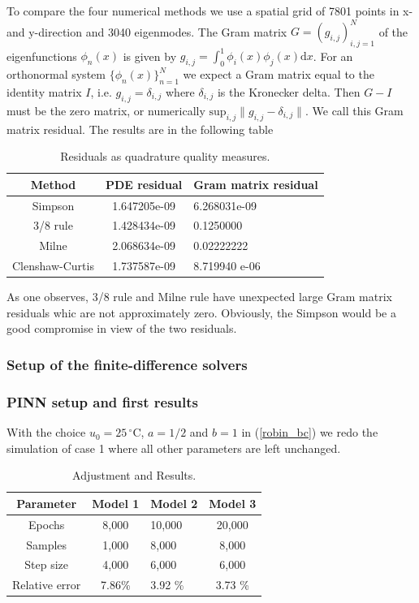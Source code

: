 \documentclass[a4paper,11pt]{article}
\theoremstyle{plain} %
\theoremstyle{definition} %
\theoremstyle{remark} %
\theoremstyle{remark}
\begin{document}
To compare the four numerical methods we use a spatial grid of 7801 points in x- and y-direction and 3040 eigenmodes. The Gram matrix $G = (g_{i,j})_{i,j=1}^N $ of the eigenfunctions $\phi_n (x) $ is given by $g_{i,j} = \int_0^1 \phi_i (x)\phi_j (x) \mathrm{d}x $. For an orthonormal system $\{ \phi_n (x) \}_{n=1}^N $ we expect a Gram matrix equal to the identity matrix $I$, i.e. $g_{i,j} = \delta_{i,j} $ where $ \delta_{i,j} $ is the Kronecker delta. Then $ G - I $ must be the zero matrix, or numerically $ \mathrm{sup}_{i,j} \| g_{i,j} - \delta_{i,j} \| $. We call this Gram matrix residual. The results are in the following table
\begin{table}[h!] 
\centering
{ \renewcommand{\arraystretch}{1.4}
\begin{tabular}{ccl}
\toprule
\textbf{Method} & \textbf{PDE residual} & \textbf{Gram matrix residual}\\
\midrule
Simpson & 1.647205e-09 & 6.268031e-09 \\
3/8 rule & 1.428434e-09 & 0.1250000 \\
Milne & 2.068634e-09 & 0.02222222 \\
Clenshaw-Curtis & 1.737587e-09 & 8.719940 e-06 \\
\bottomrule
\end{tabular}}
\caption{Residuals as quadrature quality measures.}
\label{residuals_validation2}
\end{table}
As one observes, 3/8 rule and Milne rule have unexpected large Gram matrix residuals whic are not approximately zero.
Obviously, the Simpson would be a good compromise in view of the two residuals.

\subsubsection*{Setup of the finite-difference solvers}

\subsubsection*{PINN setup and first results}
With the choice $u_0 = 25\,^{\circ}\mathrm{C} $, $a=1/2 $ and $ b=1 $ in (\ref{robin_bc}) we redo the simulation of case 1 where all other parameters are left unchanged.
\begin{table}[h!] 
\centering
{ \renewcommand{\arraystretch}{1.4}
\begin{tabular}{cclc}
\toprule
\textbf{Parameter} & \textbf{Model 1} & \textbf{Model 2}& \textbf{Model 3}\\
\midrule
Epochs & 8,000 & 10,000 & 20,000\\
Samples & 1,000 & 8,000 & 8,000 \\
Step size & 4,000 & 6,000 & 6,000 \\
Relative error & 7.86\% & 3.92 \% & 3.73 \% \\
\bottomrule
\end{tabular}}
\caption{Adjustment and Results.}
\label{AdjustmentAndResults2}
\end{table}
\end{document}

